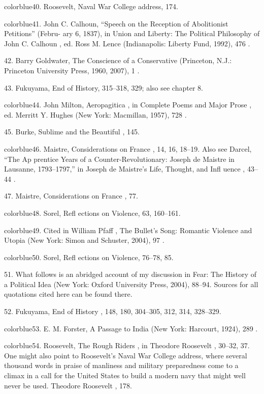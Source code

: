 	{color{blue}40}. Roosevelt, Naval War College address, 174.


	{color{blue}41}. John C. Calhoun, “Speech on the Reception of Abolitionist Petitions” (Febru- ary 6, 1837), in Union and Liberty: The Political Philosophy of John C. Calhoun , ed. Ross M. Lence (Indianapolis: Liberty Fund, 1992), 476 .


	{\color{blue}42}. Barry Goldwater, The Conscience of a Conservative (Princeton, N.J.: Princeton University Press, 1960, 2007), 1 .


	{\color{blue}43}. Fukuyama, End of History, 315–318, 329; also see chapter 8.


	{color{blue}44}. John Milton, Aeropagitica , in Complete Poems and Major Prose , ed. Merritt Y. Hughes (New York: Macmillan, 1957), 728 .


	{\color{blue}45}. Burke, Sublime and the Beautiful , 145.


	{color{blue}46}. Maistre, Considerations on France , 14, 16, 18–19. Also see Darcel, “The Ap prentice Years of a Counter-Revolutionary: Joseph de Maistre in Lausanne, 1793–1797,” in Joseph de Maistre’s Life, Thought, and Infl uence , 43–44 .


	{\color{blue}47}. Maistre, Considerations on France , 77.


	{color{blue}48}. Sorel, Refl ections on Violence, 63, 160–161.


	{color{blue}49}. Cited in William Pfaff , The Bullet’s Song: Romantic Violence and Utopia (New York: Simon and Schuster, 2004), 97 .


	{color{blue}50}. Sorel, Refl ections on Violence, 76–78, 85.


	{\color{blue}51}. What follows is an abridged account of my discussion in Fear: The History of a Political Idea (New York: Oxford University Press, 2004), 88–94. Sources for all quotations cited here can be found there.


	{\color{blue}52}. Fukuyama, End of History , 148, 180, 304–305, 312, 314, 328–329.


	{color{blue}53}. E. M. Forster, A Passage to India (New York: Harcourt, 1924), 289 .


	{color{blue}54}. Roosevelt, The Rough Riders , in Theodore Roosevelt , 30–32, 37. One might also point to Roosevelt’s Naval War College address, where several thousand words in praise of manliness and military preparedness come to a climax in a call for the United States to build a modern navy that might well never be used. Theodore Roosevelt , 178.


